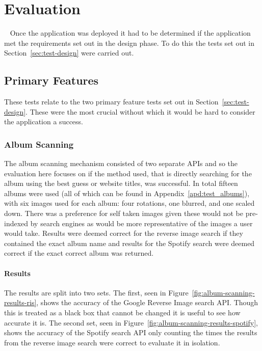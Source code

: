 \chapter{Evaluation}~\label{cha:evaluation}
Once the application was deployed it had to be determined if the application met the requirements set out in the design phase. To do this the tests set out in Section~\ref{sec:test-design} were carried out.

\section{Primary Features}
These tests relate to the two primary feature tests set out in Section~\ref{sec:test-design}. These were the most crucial without which it would be hard to consider the application a success.

\subsection{Album Scanning}
The album scanning mechanism consisted of two separate APIs and so the evaluation here focuses on if the method used, that is directly searching for the album using the best guess or website titles, was successful. In total fifteen albums were used (all of which can be found in Appendix~\ref{apd:test_albums}), with six images used for each album: four rotations, one blurred, and one scaled down. There was a preference for self taken images given these would not be pre-indexed by search engines as would be more representative of the images a user would take.
Results were deemed correct for the reverse image search if they contained the exact album name and results for the Spotify search were deemed correct if the exact correct album was returned.

\subsubsection{Results}
The results are split into two sets. The first, seen in Figure~\ref{fig:album-scanning-results-ris}, shows the accuracy of the Google Reverse Image search API. Though this is treated as a black box that cannot be changed it is useful to see how accurate it is. The second set, seen in Figure~\ref{fig:album-scanning-results-spotify}, shows the accuracy of the Spotify search API only counting the times the results from the reverse image search were correct to evaluate it in isolation.

